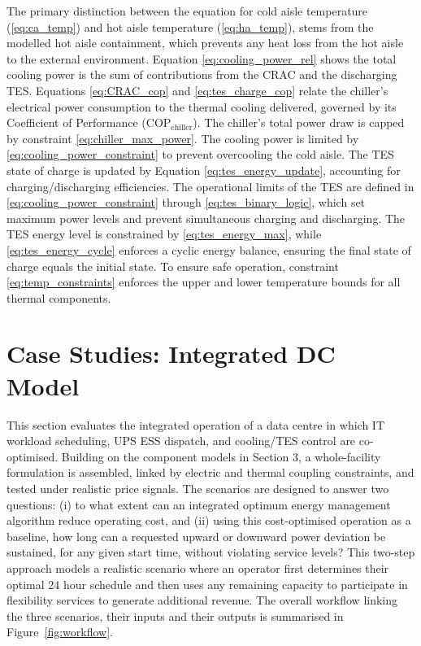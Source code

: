\documentclass[lettersize,journal]{IEEEtran}
\newcommand{\rev}[1]{\textcolor{blue!70!black}{#1}}
\begin{document}
The primary distinction between the equation for cold aisle temperature (\ref{eq:ca_temp}) and hot aisle temperature (\ref{eq:ha_temp}), stems from the modelled hot aisle containment, which prevents any heat loss from the hot aisle to the external environment. Equation \eqref{eq:cooling_power_rel} shows the total cooling power is the sum of contributions from the CRAC and the discharging TES. Equations \eqref{eq:CRAC_cop} and \eqref{eq:tes_charge_cop} relate the chiller's electrical power consumption to the thermal cooling delivered, governed by its Coefficient of Performance ($\mathrm{COP}_{\mathrm{chiller}}$). The chiller's total power draw is capped by constraint \eqref{eq:chiller_max_power}. The cooling power is limited by \eqref{eq:cooling_power_constraint} to prevent overcooling the cold aisle. The TES state of charge is updated by Equation \eqref{eq:tes_energy_update}, accounting for charging/discharging efficiencies. The operational limits of the TES are defined in \eqref{eq:cooling_power_constraint} through \eqref{eq:tes_binary_logic}, which set maximum power levels and prevent simultaneous charging and discharging. The TES energy level is constrained by \eqref{eq:tes_energy_max}, while \eqref{eq:tes_energy_cycle} enforces a cyclic energy balance, ensuring the final state of charge equals the initial state.
To ensure safe operation, constraint \eqref{eq:temp_constraints} enforces the upper and lower temperature bounds for all thermal components.
 

\section{Case Studies: Integrated DC Model}\label{sec:integrated_model and case studies}

This section evaluates the integrated operation of a data centre  in which IT workload scheduling, UPS ESS dispatch, and cooling/TES control are co-optimised. Building on the component models in Section 3, a whole-facility formulation is assembled, linked by electric and thermal coupling constraints, and tested under realistic price signals. The scenarios are designed to answer two questions: (i) to what extent can an integrated optimum energy management algorithm reduce operating cost, and \rev{(ii) using this cost-optimised operation as a baseline, how long can a requested upward or downward power deviation be sustained, for any given start time, without violating service levels?} This two-step approach models a realistic scenario where an operator first determines their optimal 24 hour schedule and then uses any remaining capacity to participate in flexibility services to generate additional revenue. \rev{The overall workflow linking the three scenarios, their inputs and their outputs is summarised in Figure~\ref{fig:workflow}.}
\end{document}
